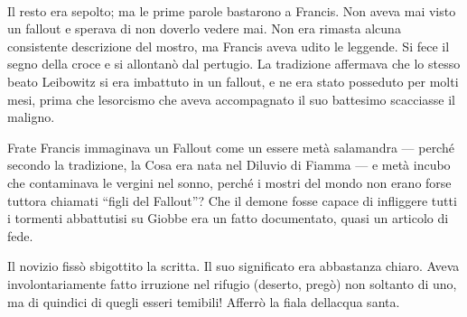 \begin{center}
\end{center}
\leavevmode\\
Il resto era sepolto; ma le prime parole bastarono a Francis. Non aveva
mai visto un fallout e sperava di non doverlo vedere mai. Non era
rimasta alcuna consistente descrizione del mostro, ma Francis aveva
udito le leggende. Si fece il segno della croce e si allontanò dal
pertugio. La tradizione affermava che lo stesso beato Leibowitz si era
imbattuto in un fallout, e ne era stato posseduto per molti mesi, prima
che l\textquotesingle esorcismo che aveva accompagnato il suo battesimo
scacciasse il maligno.

Frate Francis immaginava un Fallout come un essere metà salamandra ---
perché secondo la tradizione, la Cosa era nata nel Diluvio di Fiamma ---
e metà incubo che contaminava le vergini nel sonno, perché i mostri del
mondo non erano forse tuttora chiamati ``figli del Fallout''? Che il
demone fosse capace di infliggere tutti i tormenti abbattutisi su Giobbe
era un fatto documentato, quasi un articolo di fede.

Il novizio fissò sbigottito la scritta. Il suo significato era
abbastanza chiaro. Aveva involontariamente fatto irruzione nel rifugio
(deserto, pregò) non soltanto di uno, ma di quindici di quegli esseri
temibili! Afferrò la fiala dell\textquotesingle acqua santa.

\newpage